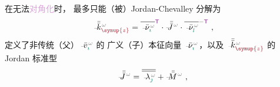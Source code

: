  在无法\textcolor{Plum}{对角化}时， 最多只能（被）\textcolor{PineGreen}{Jordan-Chevalley 分解}为
\begin{align} \label{eq:kz-Jordan_decompose}
	\xint{\begin{smallmatrix} ~ \\ {}^{}_{\mathcolor{gray}{-}} \\ ~ \end{smallmatrix}}{15}{\bar{\bar{k}}}_{\textcolor{Maroon}{\symup{z}}}^{\;\! \mathcolor{gray}{\omega}} = \overline{\xint{\begin{smallmatrix} ~ \\ {}^{}_{\mathcolor{gray}{-}} \\ ~ \end{smallmatrix}}{15}{\bar{\nu}}^{\;\!\mathcolor{gray}{\omega}}_{\textcolor{PineGreen}{\imath}}}^{\mathsf{\textcolor{Plum}{T}}} \cdot \xint{\mathcolor{gray}{-}}{25}{\bar{\bar{J}}}^{\;\!\mathcolor{gray}{\omega}} \cdot \overline{\xint{\begin{smallmatrix} ~ \\ {}^{}_{\mathcolor{gray}{-}} \\ ~ \end{smallmatrix}}{15}{\bar{\nu}}^{\;\!\mathcolor{gray}{\omega}}_{\textcolor{PineGreen}{l}}}^{-{\mathsf{\textcolor{Plum}{T}}}} ~,
\end{align}
定义了非传统（父）$\xint{\begin{smallmatrix} ~ \\ {}^{}_{\mathcolor{gray}{-}} \\ ~ \end{smallmatrix}}{15}{\bar{v}}^{\;\!\mathcolor{gray}{\omega}}_{\textcolor{PineGreen}{\imath}}$ 的 广义（子）\textcolor{PineGreen}{本征向量} $\xint{\begin{smallmatrix} ~ \\ {}^{}_{\mathcolor{gray}{-}} \\ ~ \end{smallmatrix}}{15}{\bar{\nu}}^{\;\!\mathcolor{gray}{\omega}}_{\textcolor{PineGreen}{\imath}}$，以及 $\xint{\begin{smallmatrix} ~ \\ {}^{}_{\mathcolor{gray}{-}} \\ ~ \end{smallmatrix}}{15}{\bar{\bar{k}}}_{\textcolor{Maroon}{\symup{z}}}^{\;\! \mathcolor{gray}{\omega}}$ 的 \textcolor{PineGreen}{Jordan 标准型}
\begin{align} \label{eq:kz-Jordan_normal_form}
	\xint{\mathcolor{gray}{-}}{25}{\bar{\bar{J}}}^{\;\!\mathcolor{gray}{\omega}} = \overline{\overline{\xint{\begin{smallmatrix} ~ \\ {}^{}_{\mathcolor{gray}{-}} \\ ~ \end{smallmatrix}}{22}{\lambda}^{\;\!\mathcolor{gray}{\omega}}_{\textcolor{PineGreen}{\jmath}}}} + \xint{\mathcolor{gray}{-}}{18}{\bar{\bar{M}}}^{\;\!\mathcolor{gray}{\omega}} ~,
\end{align}
